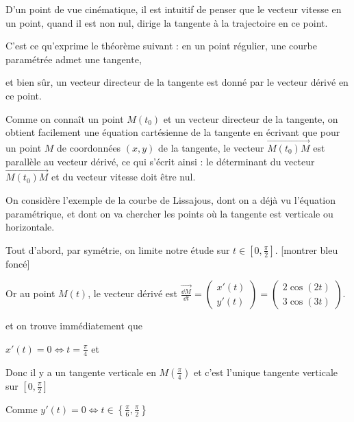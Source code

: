 \diapo

D'un point de vue cinématique, il est intuitif de penser que 
le vecteur vitesse en un point, quand il est non nul, 
dirige la tangente à la trajectoire en ce point.

C'est ce qu'exprime le théorème suivant : 
en un point régulier, une courbe paramétrée admet une tangente, 

et bien sûr, un vecteur directeur de la tangente est donné 
par le vecteur dérivé en ce point.


\change

Comme on connaît un point $M(t_0)$ et un vecteur directeur de la tangente, 
on obtient facilement une équation cartésienne de la tangente en écrivant 
que pour un point $M$ de coordonnées $(x,y)$ de la tangente, 
le vecteur $\overrightarrow{M(t_0)M}$ est parallèle au vecteur dérivé, ce qui s'écrit ainsi :
le déterminant du vecteur $\overrightarrow{M(t_0)M}$ et du 
vecteur vitesse doit être nul. 


\diapo

On considère l'exemple de la courbe de Lissajous, 
dont on a déjà vu l'équation paramétrique, et dont on va 
chercher les points où la tangente est verticale ou horizontale.

\change

Tout d'abord, par symétrie, on limite notre étude sur $t\in[0,\frac\pi2]$.
[montrer bleu foncé]

\change

Or au point $M(t)$, le vecteur dérivé est
$\overrightarrow{\frac{\dd M}{\dd t}}
= \left(\begin{matrix} x'(t) \\ y'(t) \end{matrix}\right)
= \left(\begin{matrix} 2\cos(2t) \\ 3\cos(3t)\end{matrix}\right).$


\change

et on trouve immédiatement que 

$x'(t) = 0 \iff t = \frac\pi4$ et

\change
Donc il y a un tangente verticale en $M(\frac\pi4)$ et c'est l'unique 
tangente verticale sur $[0,\frac\pi2]$

\change
Comme
$y'(t) = 0 \iff t \in \left\{ \frac\pi6  ,\frac\pi2\right\} $

